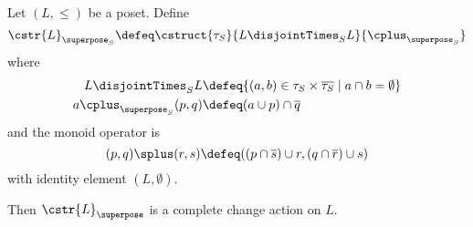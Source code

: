 

\begin{prop}[name=Scott change actions, restate=hodatalog]
 Let $(L, \leq)$ be a poset. Define
  \begin{displaymath}
    \cstr{L}_{\superposeS} 
    \defeq \cstruct{\tau_S
    }{L \disjointTimesS L}{\twistS}
  \end{displaymath}
  where
  \begin{align*}
    L \disjointTimesS L &\defeq \{ (a, b) \in \tau_S \times \overline{\tau_S} \mid a \cap b = \emptyset \}\\
    a \twistS (p, q) &\defeq (a \cup p) \cap \overline q
  \end{align*}
  and the monoid operator is
  \begin{displaymath}
    (p, q) \splus (r, s) \defeq ((p \cap \overline s) \cup r, (q \cap \overline r) \cup s)
  \end{displaymath}
  with identity element $(L, \emptyset)$.

  Then $\cstr{L}_\superpose$ is a complete change action on $L$.
\end{prop}


